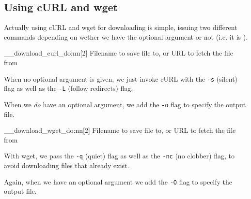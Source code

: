 \documentclass{skdoc}
\begin{document}
    \subsection{Using cURL and wget}
    Actually using cURL and wget for downloading is simple, issuing
    two different commands depending on wether we have the optional
    argument or not (i.e. it is ).

    \begin{macro}{\__download_curl_do:nn}[2]
        {Filename to save file to, or }
        {URL to fetch the file from}
\begin{MacroCode}{package}
\cs_new_protected:Npn\__download_curl_do:nn#1#2{
    \IfNoValueTF{#1}{
\end{MacroCode}
    When no optional argument is given, we just invoke cURL with the
    \texttt{-s} (silent) flag as well as the \texttt{-L} (follow
    redirects) flag.
\begin{MacroCode}{package}
        \immediate{}
    }{
\end{MacroCode}
    When we \emph{do} have an optional argument, we add the \texttt{-o}
    flag to specify the output file.
\begin{MacroCode}{package}
        \immediate{}
    }
}
\end{MacroCode}
    \end{macro}

    \begin{macro}{\__download_wget_do:nn}[2]
        {Filename to save file to, or }
        {URL to fetch the file from}
\begin{MacroCode}{package}
\cs_new_protected:Npn\__download_wget_do:nn#1#2{
    \IfNoValueTF{#1}{
\end{MacroCode}
    With wget, we pass the \texttt{-q} (quiet) flag as well as the
    \texttt{-nc} (no clobber) flag, to avoid downloading files that
    already exist.
\begin{MacroCode}{package}
        \immediate{}
    }{
\end{MacroCode}
    Again, when we have an optional argument we add the \texttt{-O}
    flag to specify the output file.
\begin{MacroCode}{package}
        \immediate{}
    }
}
\end{MacroCode}
    \end{macro}
\end{document}
